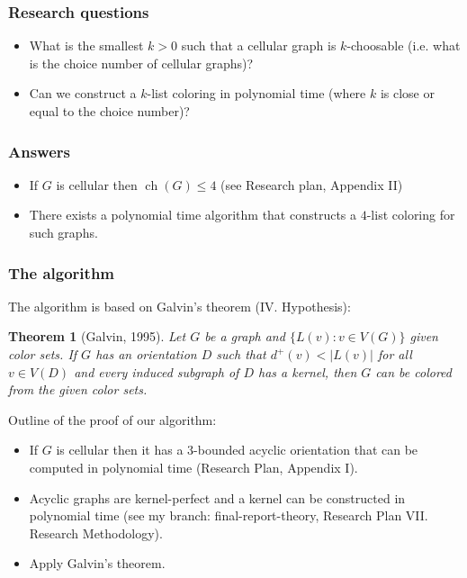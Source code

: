 \documentclass{beamer} %
\newtheorem{theo}[lem]{Theorem}
\DeclareMathOperator*{\ch}{ch}
\begin{document}
\begin{frame}
\frametitle{Research questions}
\justifying
\begin{itemize}
\item What is the smallest $k > 0$ such that a cellular graph is $k$-choosable (i.e. what is the choice number of cellular graphs)?
\pause \item Can we construct a $k$-list coloring in polynomial time (where $k$ is close or equal to the choice number)?
\end{itemize}
\end{frame}

\begin{frame}
\frametitle{Answers}
\justifying
\begin{itemize}
\item If $G$ is cellular then $\ch(G) \leqslant 4$ (see Research plan, Appendix II)
\pause \item There exists a polynomial time algorithm that constructs a $4$-list coloring for such graphs.
\end{itemize}
\end{frame}


\begin{frame}
\frametitle{The algorithm}
\justifying
The algorithm is based on Galvin's theorem (IV. Hypothesis):
\begin{theo}[Galvin, 1995] Let $G$ be a graph and $\lbrace L(v) : v \in V(G) \rbrace$ given color sets. If $G$ has an orientation $D$ such that $d^+(v) < |L(v)|$ for all $v \in V(D)$ and every induced subgraph of $D$ has a kernel, then $G$ can be colored from the given color sets.
\end{theo}
\pause Outline of the proof of our algorithm:
\begin{itemize}
\item If $G$ is cellular then it has a $3$-bounded acyclic orientation that can be computed in polynomial time (Research Plan, Appendix I).
\pause \item Acyclic graphs are kernel-perfect and a kernel can be constructed in polynomial time (see my branch: final-report-theory, Research Plan VII. Research Methodology).
\pause \item Apply Galvin's theorem.
\end{itemize}
\end{frame}
\end{document}
